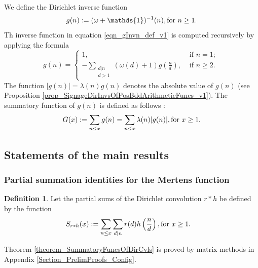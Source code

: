 \documentclass[11pt,reqno,a4letter]{article}
\newcommand{\hlocalref}[1]{\hyperref[#1]{\ref{#1}}}
\numberwithin{equation}{section}
\numberwithin{figure}{section}
\numberwithin{table}{section}
\newcommand{\seqnum}[1]{\href{http://oeis.org/#1}{\color{ProcessBlue}{\underline{#1}}}}
\theoremstyle{plain}
\numberwithin{theorem}{section}
\theoremstyle{definition}
\newtheorem{definition}[theorem]{Definition}
\theoremstyle{remark}
\newcommand{\mathtext}[1]{\text{\rm #1}}
\begin{document}
We define the Dirichlet inverse function \cite[\seqnum{A341444}]{OEIS} 
\begin{equation}
\label{eqn_gInvn_def_v1}
g(n) := (\omega + \mathds{1})^{-1}(n), \mathtext{ for } n \geq 1. 
\end{equation}
Th inverse function in equation \eqref{eqn_gInvn_def_v1} 
is computed recursively by applying the formula \cite[\S 2.7]{APOSTOLANUMT}
\[
g(n) = \begin{cases}
	1, & \text{ if $n = 1$; } \\ 
	-\sum\limits_{\substack{d|n \\ d> 1}} \left(\omega(d) + 1\right) g\left(\frac{n}{d}\right), & 
	\text{ if $n \geq 2$. }
        \end{cases}
\]
The function $|g(n)| = \lambda(n) g(n)$ denotes the absolute value of $g(n)$ 
(see Proposition \hlocalref{prop_SignageDirInvsOfPosBddArithmeticFuncs_v1}). 
The summatory function of $g(n)$ is defined as follows 
\cite[\seqnum{A341472}]{OEIS}: 
\begin{equation}
\label{eqn_GInvx_PartialSumForms_v1} 
G(x) := \sum_{n \leq x} g(n) = \sum_{n \leq x} \lambda(n) |g(n)|, \mathtext{ for } x \geq 1. 
\end{equation} 

\subsection{Statements of the main results}

\subsubsection{Partial summation identities for the Mertens function}

\begin{definition}
Let the partial sums of the 
Dirichlet convolution $r \ast h$ be defined by the function 
\begin{align*} 
S_{r \ast h}(x) & := \sum_{n \leq x} \sum_{d|n} r(d) h\left(\frac{n}{d}\right), 
	\mathtext{ for } x \geq 1. 
\end{align*}
\end{definition}

Theorem \hlocalref{theorem_SummatoryFuncsOfDirCvls} 
is proved by matrix methods in 
Appendix \hlocalref{Section_PrelimProofs_Config}.
\end{document}
